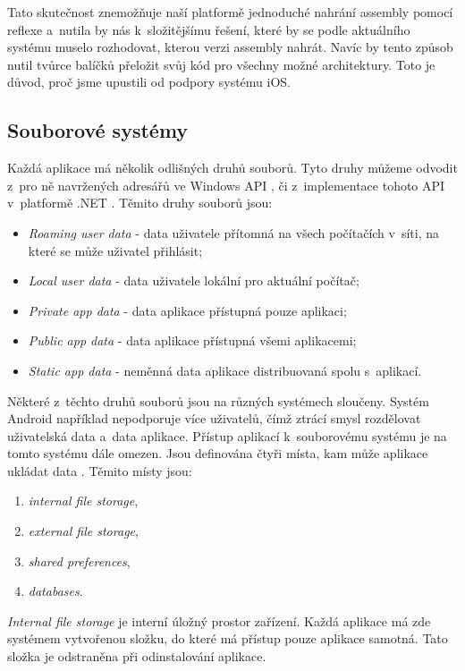 Tato skutečnost znemožňuje naší platformě jednoduché nahrání assembly pomocí reflexe a~nutila by nás k~složitějšímu řešení, které by se podle aktuálního systému muselo rozhodovat, kterou verzi assembly nahrát. Navíc by tento způsob nutil tvůrce balíčků přeložit svůj kód pro všechny možné architektury. Toto je důvod, proč jsme upustili od podpory systému iOS.

\subsection{Souborové systémy}
\label{sec:filesystems}
Každá aplikace má několik odlišných druhů souborů. Tyto druhy můžeme odvodit z~pro ně navržených adresářů ve Windows API \citep{site:knownfolders}, či z~implementace tohoto API v~platformě .NET \citep{site:specialfolders}. Těmito druhy souborů jsou:
\begin{itemize}
	\item \textit{Roaming user data} - data uživatele přítomná na všech počítačích v~síti, na které se může uživatel přihlásit;
	\item \textit{Local user data} - data uživatele lokální pro aktuální počítač;
	\item \textit{Private app data} - data aplikace přístupná pouze aplikaci;
	\item \textit{Public app data} - data aplikace přístupná všemi aplikacemi;
	\item \textit{Static app data} - neměnná data aplikace distribuovaná spolu s~aplikací.
\end{itemize} 

Některé z~těchto druhů souborů jsou na různých systémech sloučeny. Systém Android například nepodporuje více uživatelů, čímž ztrácí smysl rozdělovat uživatelská data a~data aplikace. Přístup aplikací k~souborovému systému je na tomto systému dále omezen. Jsou definována čtyři místa, kam může aplikace ukládat data \citep{site:androiddata}. Těmito místy jsou:

\begin{enumerate}
	\item \textit{internal file storage},
	\item \textit{external file storage},
	\item \textit{shared preferences},
	\item \textit{databases}.
\end{enumerate}

\textit{Internal file storage} je interní úložný prostor zařízení. Každá aplikace má zde systémem vytvořenou složku, do které má přístup pouze aplikace samotná. Tato složka je odstraněna při odinstalování aplikace.

